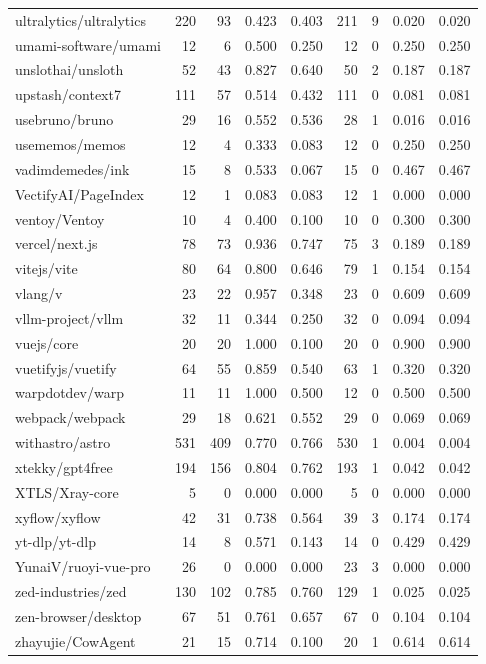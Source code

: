 \begin{tabular}{lrrrrrrrr}
ultralytics/ultralytics & 220 & 93 & 0.423 & 0.403 & 211 & 9 & 0.020 & 0.020 \\
umami-software/umami & 12 & 6 & 0.500 & 0.250 & 12 & 0 & 0.250 & 0.250 \\
unslothai/unsloth & 52 & 43 & 0.827 & 0.640 & 50 & 2 & 0.187 & 0.187 \\
upstash/context7 & 111 & 57 & 0.514 & 0.432 & 111 & 0 & 0.081 & 0.081 \\
usebruno/bruno & 29 & 16 & 0.552 & 0.536 & 28 & 1 & 0.016 & 0.016 \\
usememos/memos & 12 & 4 & 0.333 & 0.083 & 12 & 0 & 0.250 & 0.250 \\
vadimdemedes/ink & 15 & 8 & 0.533 & 0.067 & 15 & 0 & 0.467 & 0.467 \\
VectifyAI/PageIndex & 12 & 1 & 0.083 & 0.083 & 12 & 1 & 0.000 & 0.000 \\
ventoy/Ventoy & 10 & 4 & 0.400 & 0.100 & 10 & 0 & 0.300 & 0.300 \\
vercel/next.js & 78 & 73 & 0.936 & 0.747 & 75 & 3 & 0.189 & 0.189 \\
vitejs/vite & 80 & 64 & 0.800 & 0.646 & 79 & 1 & 0.154 & 0.154 \\
vlang/v & 23 & 22 & 0.957 & 0.348 & 23 & 0 & 0.609 & 0.609 \\
vllm-project/vllm & 32 & 11 & 0.344 & 0.250 & 32 & 0 & 0.094 & 0.094 \\
vuejs/core & 20 & 20 & 1.000 & 0.100 & 20 & 0 & 0.900 & 0.900 \\
vuetifyjs/vuetify & 64 & 55 & 0.859 & 0.540 & 63 & 1 & 0.320 & 0.320 \\
warpdotdev/warp & 11 & 11 & 1.000 & 0.500 & 12 & 0 & 0.500 & 0.500 \\
webpack/webpack & 29 & 18 & 0.621 & 0.552 & 29 & 0 & 0.069 & 0.069 \\
withastro/astro & 531 & 409 & 0.770 & 0.766 & 530 & 1 & 0.004 & 0.004 \\
xtekky/gpt4free & 194 & 156 & 0.804 & 0.762 & 193 & 1 & 0.042 & 0.042 \\
XTLS/Xray-core & 5 & 0 & 0.000 & 0.000 & 5 & 0 & 0.000 & 0.000 \\
xyflow/xyflow & 42 & 31 & 0.738 & 0.564 & 39 & 3 & 0.174 & 0.174 \\
yt-dlp/yt-dlp & 14 & 8 & 0.571 & 0.143 & 14 & 0 & 0.429 & 0.429 \\
YunaiV/ruoyi-vue-pro & 26 & 0 & 0.000 & 0.000 & 23 & 3 & 0.000 & 0.000 \\
zed-industries/zed & 130 & 102 & 0.785 & 0.760 & 129 & 1 & 0.025 & 0.025 \\
zen-browser/desktop & 67 & 51 & 0.761 & 0.657 & 67 & 0 & 0.104 & 0.104 \\
zhayujie/CowAgent & 21 & 15 & 0.714 & 0.100 & 20 & 1 & 0.614 & 0.614 \\
\bottomrule
\end{tabular}
